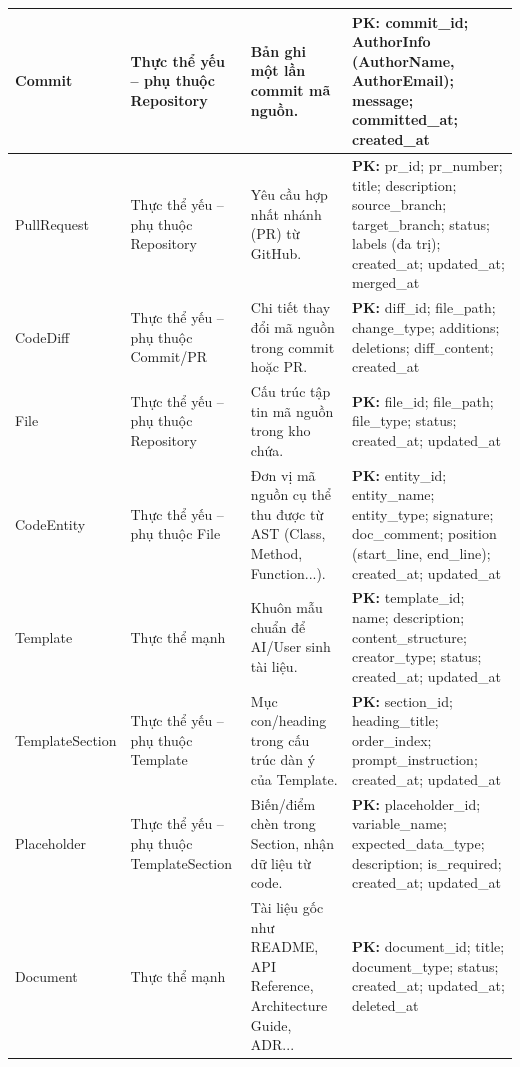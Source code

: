 \begin{longtable}{|
>{\raggedright\arraybackslash}p{}|
>{\raggedright\arraybackslash}p{}|
>{\raggedright\arraybackslash}p{}|
>{\raggedright\arraybackslash}p{}|}
Commit &
Thực thể yếu -- phụ thuộc Repository &
Bản ghi một lần commit mã nguồn. &
\textbf{PK:} commit\_id; AuthorInfo (AuthorName, AuthorEmail); message; committed\_at; created\_at
\\ \hline

Pull\allowbreak Request &
Thực thể yếu -- phụ thuộc Repository &
Yêu cầu hợp nhất nhánh (PR) từ GitHub. &
\textbf{PK:} pr\_id; pr\_number; title; description; source\_branch; target\_branch; status; labels (đa trị); created\_at; updated\_at; merged\_at
\\ \hline

Code\allowbreak Diff &
Thực thể yếu -- phụ thuộc Commit/PR &
Chi tiết thay đổi mã nguồn trong commit hoặc PR. &
\textbf{PK:} diff\_id; file\_path; change\_type; additions; deletions; diff\_content; created\_at
\\ \hline

File &
Thực thể yếu -- phụ thuộc Repository &
Cấu trúc tập tin mã nguồn trong kho chứa. &
\textbf{PK:} file\_id; file\_path; file\_type; status; created\_at; updated\_at
\\ \hline

Code\allowbreak Entity &
Thực thể yếu -- phụ thuộc File &
Đơn vị mã nguồn cụ thể thu được từ AST (Class, Method, Function...). &
\textbf{PK:} entity\_id; entity\_name; entity\_type; signature; doc\_comment; position (start\_line, end\_line); created\_at; updated\_at
\\ \hline

Template &
Thực thể mạnh &
Khuôn mẫu chuẩn để AI/User sinh tài liệu. &
\textbf{PK:} template\_id; name; description; content\_structure; creator\_type; status; created\_at; updated\_at
\\ \hline

Template\allowbreak Section &
Thực thể yếu -- phụ thuộc Template &
Mục con/heading trong cấu trúc dàn ý của Template. &
\textbf{PK:} section\_id; heading\_title; order\_index; prompt\_instruction; created\_at; updated\_at
\\ \hline

Placeholder &
Thực thể yếu -- phụ thuộc TemplateSection &
Biến/điểm chèn trong Section, nhận dữ liệu từ code. &
\textbf{PK:} placeholder\_id; variable\_name; expected\_data\_type; description; is\_required; created\_at; updated\_at
\\ \hline

Document &
Thực thể mạnh &
Tài liệu gốc như README, API Reference, Architecture Guide, ADR... &
\textbf{PK:} document\_id; title; document\_type; status; created\_at; updated\_at; deleted\_at
\\ \hline


\end{longtable}
